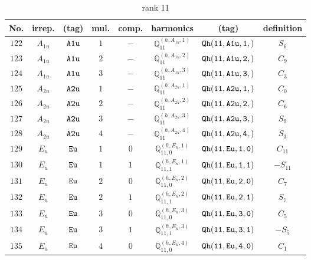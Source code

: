 \documentclass[fleqn,8pt]{jsarticle}
\begin{document}
\begin{table}[ht!]
\begin{center}
\caption{rank 11}
\renewcommand{\arraystretch}{1.3}
\begin{tabular}{cccccccc} \hline \hline
No. & irrep. & (tag) & mul. & comp. & harmonics & (tag) & definition \\ \hline
$ 122 $ & $ A_{1u} $ & $ {\tt A1u} $ & $ 1 $ & $ - $ & $ \mathbb{Q}_{11}^{(h,A_{1u},1)} $ & $ {\tt Qh(11,A1u,1,)} $ & $ S_{6} $ \\
$ 123 $ & $ A_{1u} $ & $ {\tt A1u} $ & $ 2 $ & $ - $ & $ \mathbb{Q}_{11}^{(h,A_{1u},2)} $ & $ {\tt Qh(11,A1u,2,)} $ & $ C_{9} $ \\
$ 124 $ & $ A_{1u} $ & $ {\tt A1u} $ & $ 3 $ & $ - $ & $ \mathbb{Q}_{11}^{(h,A_{1u},3)} $ & $ {\tt Qh(11,A1u,3,)} $ & $ C_{3} $ \\
$ 125 $ & $ A_{2u} $ & $ {\tt A2u} $ & $ 1 $ & $ - $ & $ \mathbb{Q}_{11}^{(h,A_{2u},1)} $ & $ {\tt Qh(11,A2u,1,)} $ & $ C_{0} $ \\
$ 126 $ & $ A_{2u} $ & $ {\tt A2u} $ & $ 2 $ & $ - $ & $ \mathbb{Q}_{11}^{(h,A_{2u},2)} $ & $ {\tt Qh(11,A2u,2,)} $ & $ C_{6} $ \\
$ 127 $ & $ A_{2u} $ & $ {\tt A2u} $ & $ 3 $ & $ - $ & $ \mathbb{Q}_{11}^{(h,A_{2u},3)} $ & $ {\tt Qh(11,A2u,3,)} $ & $ S_{9} $ \\
$ 128 $ & $ A_{2u} $ & $ {\tt A2u} $ & $ 4 $ & $ - $ & $ \mathbb{Q}_{11}^{(h,A_{2u},4)} $ & $ {\tt Qh(11,A2u,4,)} $ & $ S_{3} $ \\
$ 129 $ & $ E_{u} $ & $ {\tt Eu} $ & $ 1 $ & $ 0 $ & $ \mathbb{Q}_{11,0}^{(h,E_{u},1)} $ & $ {\tt Qh(11,Eu,1,0)} $ & $ C_{11} $ \\
$ 130 $ & $ E_{u} $ & $ {\tt Eu} $ & $ 1 $ & $ 1 $ & $ \mathbb{Q}_{11,1}^{(h,E_{u},1)} $ & $ {\tt Qh(11,Eu,1,1)} $ & $ - S_{11} $ \\
$ 131 $ & $ E_{u} $ & $ {\tt Eu} $ & $ 2 $ & $ 0 $ & $ \mathbb{Q}_{11,0}^{(h,E_{u},2)} $ & $ {\tt Qh(11,Eu,2,0)} $ & $ C_{7} $ \\
$ 132 $ & $ E_{u} $ & $ {\tt Eu} $ & $ 2 $ & $ 1 $ & $ \mathbb{Q}_{11,1}^{(h,E_{u},2)} $ & $ {\tt Qh(11,Eu,2,1)} $ & $ S_{7} $ \\
$ 133 $ & $ E_{u} $ & $ {\tt Eu} $ & $ 3 $ & $ 0 $ & $ \mathbb{Q}_{11,0}^{(h,E_{u},3)} $ & $ {\tt Qh(11,Eu,3,0)} $ & $ C_{5} $ \\
$ 134 $ & $ E_{u} $ & $ {\tt Eu} $ & $ 3 $ & $ 1 $ & $ \mathbb{Q}_{11,1}^{(h,E_{u},3)} $ & $ {\tt Qh(11,Eu,3,1)} $ & $ - S_{5} $ \\
$ 135 $ & $ E_{u} $ & $ {\tt Eu} $ & $ 4 $ & $ 0 $ & $ \mathbb{Q}_{11,0}^{(h,E_{u},4)} $ & $ {\tt Qh(11,Eu,4,0)} $ & $ C_{1} $ \\

\end{tabular}
\end{center}
\end{table}
\end{document}
